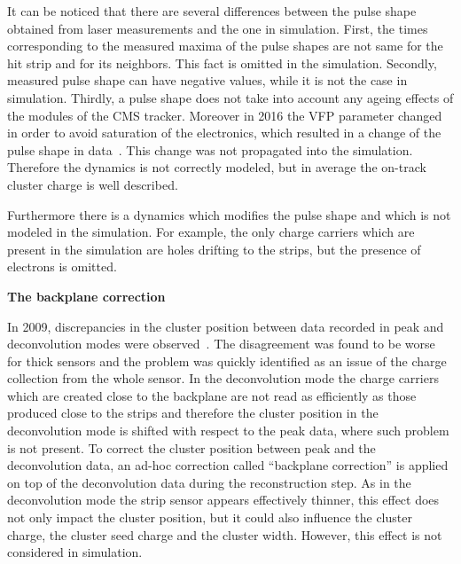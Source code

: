 It can be noticed that there are several differences between the pulse shape obtained from laser measurements and the one in simulation. First, the times corresponding to the measured maxima of the pulse shapes are not same for the hit strip and for its neighbors. This fact is omitted in the simulation. Secondly, measured pulse shape can have negative values, while it is not the case in simulation. Thirdly, a pulse shape does not take into account any ageing effects of the modules of the CMS tracker. Moreover in 2016 the VFP parameter changed in order to avoid saturation of the electronics, which resulted in a change of the pulse shape in data~\cite{website:vfp}. This change was not propagated into the simulation. Therefore the dynamics is not correctly modeled, but in average the on-track cluster charge is well described. 

Furthermore there is a dynamics which modifies the pulse shape and which is not modeled in the simulation. For example, the only charge carriers which are present in the simulation are holes drifting to the strips, but the presence of electrons is omitted.

\textbf{The backplane correction}

In 2009, discrepancies in the cluster position between data recorded in peak and deconvolution modes were observed~\cite{website:backplane}. The disagreement was found to be worse for thick sensors and the problem was quickly identified as an issue of the charge collection from the whole sensor. In the deconvolution mode the charge carriers which are created close to the backplane are not read as efficiently as those produced close to the strips and therefore the cluster position in the deconvolution mode is shifted with respect to the peak data, where such problem is not present. To correct the cluster position between peak and the deconvolution data, an ad-hoc correction called ``backplane correction'' is applied on top of the deconvolution data during the reconstruction step. As in the deconvolution mode the strip sensor appears effectively thinner, this effect does not only impact the cluster position, but it could also influence the cluster charge, the cluster seed charge and the cluster width. However, this effect is not considered in simulation.




